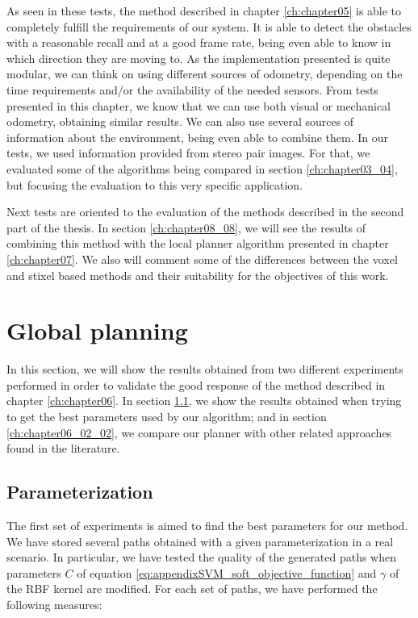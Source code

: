 As seen in these tests, the method described in chapter \ref{ch:chapter05} is able to completely fulfill the requirements of our system. It is able to detect the obstacles with a reasonable recall and at a good frame rate, being even able to know in which direction they are moving to. As the implementation presented is quite modular, we can think on using different sources of odometry, depending on the time requirements and/or the availability of the needed sensors. From tests presented in this chapter, we know that we can use both visual or mechanical odometry, obtaining similar results. We can also use several sources of information about the environment, being even able to combine them. In our tests, we used information provided from stereo pair images. For that, we evaluated some of the algorithms being compared in section \ref{ch:chapter03_04}, but focusing the evaluation to this very specific application.

Next tests are oriented to the evaluation of the methods described in the second part of the thesis. In section \ref{ch:chapter08_08}, we will see the results of combining this method with the local planner algorithm presented in chapter \ref{ch:chapter07}. We also will comment some of the differences between the voxel and stixel based methods and their suitability for the objectives of this work.
 
\FloatBarrier
 
\graphicspath{{./images/chapter06/bmps/}{./images/chapter06/vects/}{./images/chapter06/}}
\section{Global planning}\label{ch:chapter06_02}

In this section, we will show the results obtained from two different experiments performed in order to validate the good response of the method described in chapter \ref{ch:chapter06}. In section \ref{ch:chapter06_02_01}, we show the results obtained when trying to get the best parameters used by our algorithm; and in section \ref{ch:chapter06_02_02}, we compare our planner with other related approaches found in the literature.

\subsection{Parameterization}\label{ch:chapter06_02_01}

The first set of experiments is aimed to find the best parameters for our method. We have stored several paths obtained with a given parameterization in a real scenario. In particular, we have tested the quality of the generated paths when parameters $C$ of equation \ref{eq:appendixSVM_soft_objective_function} and $\gamma$ of the \ac{RBF} kernel are modified. For each set of paths, we have performed the following measures:

